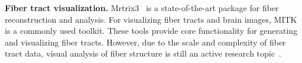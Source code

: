 \noindent\textbf{Fiber tract visualization.}
Mrtrix3~\cite{tournier2012mrtrix} is a state-of-the-art package for fiber reconstruction and analysis.
For visualizing fiber tracts and brain images, MITK~\cite{Fritzsche2012MITKDI} is a commonly used toolkit.
These tools provide core functionality for generating and visualizing fiber tracts. However, due to the scale and complexity of fiber tract data, visual analysis of fiber structure 
is still an active research topic~\cite{everts2015exploration}.
%
%

